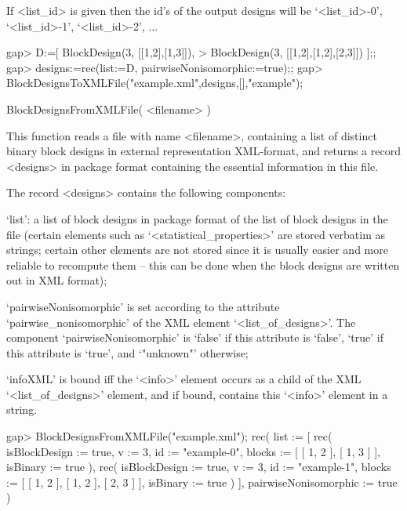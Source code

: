 If <list_id> is given then the id's of the output designs will be
`<list_id>-0', `<list_id>-1', `<list_id>-2', ...

\beginexample
gap> D:=[ BlockDesign(3, [[1,2],[1,3]]),                        
>         BlockDesign(3, [[1,2],[1,2],[2,3]]) ];;
gap> designs:=rec(list:=D, pairwiseNonisomorphic:=true);;
gap> BlockDesignsToXMLFile("example.xml",designs,[],"example"); 
\endexample


\>BlockDesignsFromXMLFile( <filename> )

This function reads a file with name <filename>, containing a list of
distinct binary block designs in external representation XML-format,
and returns a record  <designs> in {\DESIGN} package format containing
the essential information in this file.

The record <designs> contains the following components:

`list': a list of block designs in {\DESIGN} package format of
the list of block designs in the file (certain elements such as
`<statistical_properties>' are stored verbatim as strings; certain other
elements are not stored since it is usually easier and more reliable to
recompute them -- this can be done when the block designs are written
out in XML format);

`pairwiseNonisomorphic' is set according to the attribute
`pairwise_nonisomorphic' of the XML element `<list_of_designs>'.
The component `pairwiseNonisomorphic' is `false' if this attribute
is `false', `true' if this attribute is `true', and `"unknown"' otherwise;

`infoXML' is bound iff the `<info>' element occurs as a child of the
XML `<list_of_designs>' element, and if bound, contains this `<info>'
element in a string.

\beginexample
gap> BlockDesignsFromXMLFile("example.xml");
rec( 
  list := [ rec( isBlockDesign := true, v := 3, id := "example-0", blocks := 
            [ [ 1, 2 ], [ 1, 3 ] ], isBinary := true ), 
      rec( isBlockDesign := true, v := 3, id := "example-1", 
          blocks := [ [ 1, 2 ], [ 1, 2 ], [ 2, 3 ] ], isBinary := true ) ], 
  pairwiseNonisomorphic := true )
\endexample
